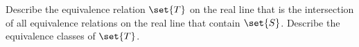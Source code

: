 \documentclass[main.tex]{subfiles}
\begin{document}
\subproblem{}\label{s03p05c}

Describe the equivalence relation \(\set{T}\) on the real line that is the
intersection of all equivalence relations on the real line that contain
\(\set{S}\). Describe the equivalence classes of \(\set{T}\).

\todo{}
\end{document}

